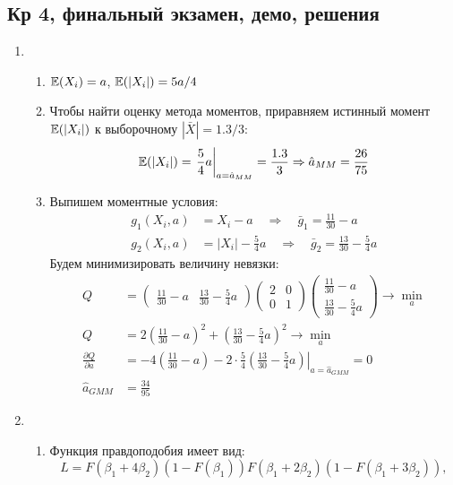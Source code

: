 \documentclass[12pt, a4paper]{article}
\theoremstyle{definition}
\begin{document}
\subsection{Кр 4, финальный экзамен, демо, решения}


\begin{enumerate}
\item
\begin{enumerate}
\item $\mathbb{E}(X_i) = a$, $\mathbb{E}(|X_i|) = 5a/4$
\item Чтобы найти оценку метода моментов, приравняем истинный момент $\mathbb{E}(|X_i|)$
к выборочному $|\bar X| = 1.3/3$:
\[
\mathbb{E}(|X_i|) = \left. \frac{5}{4} a \right|_{a = \hat{a}_{MM}} = \frac{1.3}{3} \Rightarrow \hat{a}_{MM} = \frac{26}{75}
\]
\item Выпишем моментные условия:
\begin{align*}
g_1(X_i, a) &= X_i - a \quad \Rightarrow  \quad \bar{g}_1 = \frac{11}{30} - a \\
g_2(X_i, a) &= |X_i| -\frac{5}{4} a \quad \Rightarrow \quad \bar{g}_2 = \frac{13}{30} - \frac{5}{4}a
\end{align*}
Будем минимизировать величину невязки:
\begin{align*}
Q &= \begin{pmatrix}
\frac{11}{30} - a & \frac{13}{30} - \frac{5}{4}a
\end{pmatrix}
\begin{pmatrix}
2 & 0 \\
0 & 1
\end{pmatrix}
\begin{pmatrix}
\frac{11}{30} - a \\
\frac{13}{30} - \frac{5}{4}a
\end{pmatrix}
\to \min_a \\
Q &= 2\left(\frac{11}{30} - a\right)^2 + \left(\frac{13}{30} - \frac{5}{4}a \right)^2 \to \min_a \\
\frac{\partial Q}{\partial a} &= \left. -4 \left(\frac{11}{30} - a \right) - 2 \cdot \frac{5}{4} \left(\frac{13}{30} - \frac{5}{4}a \right) \right|_{a = \hat{a}_{GMM}} = 0 \\
\hat{a}_{GMM} &= \frac{34}{95}
\end{align*}
\end{enumerate}
\item
\begin{enumerate}
\item Функция правдоподобия имеет вид:
\[
L = F(\beta_1 + 4\beta_2)(1 - F(\beta_1))F(\beta_1 + 2\beta_2)(1 - F(\beta_1 + 3\beta_2)),
\]
\end{enumerate}
\end{enumerate}
\end{document}
